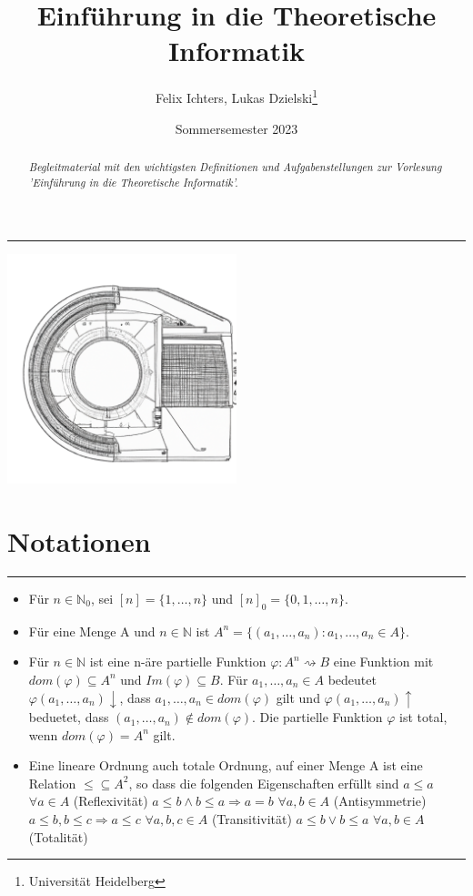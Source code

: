 \documentclass[DIV=15]{scrartcl}
\title{Einführung in die Theoretische Informatik}
\author{Felix Ichters, Lukas Dzielski\thanks{Universität Heidelberg}}
\date{Sommersemester 2023}
\begin{document}
\maketitle
\rule{467.1pt}{0.4pt}

\begin{abstract}
\begin{flushright}
    \textit{Begleitmaterial mit den wichtigsten Definitionen und Aufgabenstellungen zur Vorlesung 'Einführung in die Theoretische Informatik'.}
\end{flushright}    
\end{abstract}
\bigskip\bigskip
\begin{center}
\includegraphics[width=0.5\textwidth]{dall2.png}    
\end{center}

\newpage
\tableofcontents
\newpage
\section{Notationen}
\rule{467.1pt}{0.4pt}
\begin{itemize}
    \item Für \(n\in\mathbb{N}_0\), sei \([n]=\{1,\dots,n\}\) und \([n]_0=\{0,1,\dots,n\}\).
    \item Für eine Menge A und \(n\in\mathbb{N}\) ist \(A^n=\{(a_1,\dots,a_n):a_1,\dots,a_n\in A\}\).
    \item Für \(n\in\mathbb{N}\) ist eine n-äre partielle Funktion \(\varphi:A^n\rightsquigarrow B\) eine Funktion
    mit \(dom(\varphi)\subseteq A^n\) und \(Im(\varphi)\subseteq B\).
    Für \(a_1,\dots,a_n\in A\) bedeutet \(\varphi(a_1,\dots,a_n)\downarrow\), dass \(a_1,\dots,a_n\in dom(\varphi)\) gilt und 
    \(\varphi(a_1,\dots,a_n)\uparrow\) beduetet, dass \((a_1,\dots,a_n)\notin dom(\varphi)\).
    Die partielle Funktion \(\varphi\) ist total, wenn \(dom(\varphi)=A^n\) gilt.
    \item Eine lineare Ordnung auch totale Ordnung, auf einer Menge A ist eine Relation \(\leq\subseteq A^2\), so dass 
    die folgenden Eigenschaften erfüllt sind
        \subitem \(a\leq a\) \(\forall a\in A\) (Reflexivität)
        \subitem \(a\leq b\wedge b\leq a\Rightarrow a=b\) \(\forall a,b\in A\) (Antisymmetrie)
        \subitem \(a\leq b,b\leq c\Rightarrow a\leq c\) \(\forall a,b,c\in A\) (Transitivität)
        \subitem \(a\leq b\vee b\leq a\) \(\forall a,b\in A\) (Totalität)
\end{itemize}
\newpage
\end{document}
